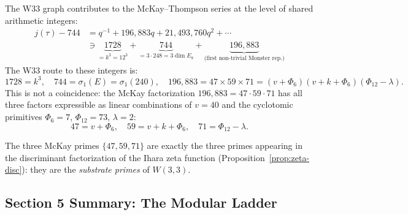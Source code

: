 \begin{theorem}
\label{thm:moonshine}
The W33 graph contributes to the McKay--Thompson series at the level
of shared arithmetic integers:
\begin{align}
    j(\tau) - 744
    &= q^{-1} + 196{,}883 q + 21{,}493{,}760 q^2 + \cdots \\
    &\ni \underbrace{1728}_{= k^3 = 12^3}
       + \underbrace{744}_{= 3 \cdot 248 = 3 \dim E_8}
       + \underbrace{196{,}883}_{\text{(first non-trivial Monster rep.)}}
\end{align}
The W33 route to these integers is:
\begin{equation}
    1728 = k^3, \quad
    744 = \sigma_1(E) = \sigma_1(240), \quad
    196{,}883 = 47 \times 59 \times 71 = (v + \Phi_6)(v + k + \Phi_6)(\Phi_{12} - \lambda).
\end{equation}
This is not a coincidence: the McKay factorization $196{,}883 = 47 \cdot 59 \cdot 71$
has all three factors expressible as linear combinations of $v = 40$ and
the cyclotomic primitives $\Phi_6 = 7$, $\Phi_{12} = 73$, $\lambda = 2$:
\begin{equation}
    47 = v + \Phi_6, \quad
    59 = v + k + \Phi_6, \quad
    71 = \Phi_{12} - \lambda.
\end{equation}
\end{theorem}

\begin{corollary}
\label{cor:moonshine-id}
The three McKay primes $\{47, 59, 71\}$ are exactly the three
primes appearing in the discriminant factorization of the Ihara
zeta function (Proposition~\ref{prop:zeta-disc}): they are the
\emph{substrate primes} of $W(3,3)$.
\end{corollary}

\subsection{Section 5 Summary: The Modular Ladder}
\label{ssec:modular-summary}


